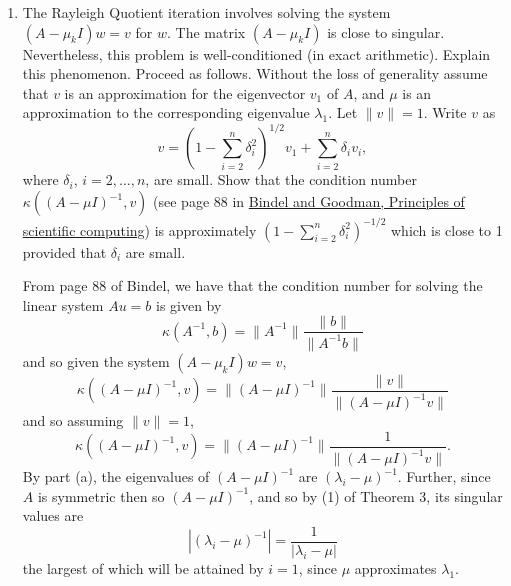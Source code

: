 \documentclass{../../../kin_math}
\begin{document}
\begin{questions}
\begin{enumerate}
    \item The Rayleigh Quotient iteration involves solving the system $(A - \mu_k I) w = v$ for $w$. The matrix $(A - \mu_k I)$ is close to singular. Nevertheless, this problem is well-conditioned (in exact arithmetic). Explain this phenomenon. Proceed as follows. Without the loss of generality assume that $v$ is an approximation for the eigenvector $v_1$ of $A$, and $\mu$ is an approximation to the corresponding eigenvalue $\lambda_1$. Let $\lVert v \rVert = 1$. Write $v$ as
    \begin{equation*}
      v = \left(1- \sum_{i = 2}^n \delta_i^2\right)^{1 / 2} v_1 + \sum_{i = 2}^n \delta_i v_i,
    \end{equation*}
    where $\delta_i$, $i = 2, \dots, n$, are small. Show that the condition number $\kappa((A - \mu I)^{-1}, v)$ (see page 88 in \href{https://math.nyu.edu/~shelley/Classes/SciComp/BindelGoodman.pdf}{Bindel and Goodman, Principles of scientific computing}) is approximately $(1 - \sum_{i = 2}^n \delta_i^2)^{-1 / 2}$ which is close to 1 provided that $\delta_i$ are small.
    \begin{solution}
      From page 88 of Bindel, we have that the condition number for solving the linear system $Au = b$ is given by
      \begin{equation*}
        \kappa(A^{-1}, b) = \lVert A^{-1} \rVert \frac{\lVert b \rVert}{\lVert A^{-1} b \rVert}
      \end{equation*}
      and so given the system $(A - \mu_k I) w = v$,
      \begin{equation*}
        \kappa((A - \mu I)^{-1}, v) = \lVert (A - \mu I)^{-1} \rVert \frac{\lVert v \rVert}{\lVert (A - \mu I)^{-1} v \rVert}
      \end{equation*}
      and so assuming $\lVert v \rVert = 1$,
      \begin{equation}
        \label{eq:cond}
        \kappa((A - \mu I)^{-1}, v) = \lVert (A - \mu I)^{-1} \rVert \frac{1}{\lVert (A - \mu I)^{-1} v \rVert}.
      \end{equation}
      By part (a), the eigenvalues of $(A - \mu I)^{-1}$ are $(\lambda_i - \mu)^{-1}$. Further, since $A$ is symmetric then so $(A - \mu I)^{-1}$, and so by (1) of Theorem 3, its singular values are
      \begin{equation*}
        |(\lambda_i - \mu)^{-1}| = \frac{1}{|\lambda_i - \mu|}
      \end{equation*}
      the largest of which will be attained by $i = 1$, since $\mu$ approximates $\lambda_1$.

\end{solution}
\end{enumerate}
\end{questions}
\end{document}
